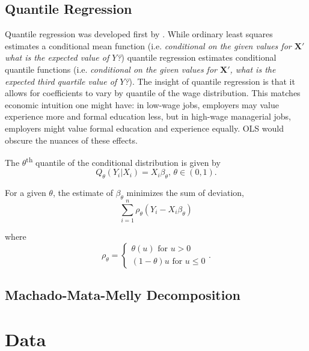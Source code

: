 \documentclass[12pt]{article}
\begin{document}
\subsection{Quantile Regression
\label{subsec:quantile-regression}}
Quantile regression was developed first by \citet{KoenkerandBassett1978}. While ordinary least squares estimates a conditional mean function (i.e.\textit{ conditional on the given values for $\mathbf{X'}$ what is the expected value of $Y$?}) quantile regression estimates conditional quantile functions (i.e.\textit{ conditional on the given values for $\mathbf{X'}$, what is the expected third quartile value of $Y$?}). The insight of quantile regression is that it allows for coefficients to vary by quantile of the wage distribution. This matches economic intuition one might have: in low-wage jobs, employers may value experience more and formal education less, but in high-wage managerial jobs, employers might value formal education and experience equally. OLS would obscure the nuances of these effects.

The $\theta$\textsuperscript{th} quantile of the conditional distribution is given by
\begin{equation}
	Q_{\theta}\left(Y_i|X_i \right) = X_{i}\beta_{\theta}, \, \theta \in (0, 1)
.\end{equation}

For a given $\theta$, the estimate of $\beta_{\theta}$ minimizes the sum of deviation,
\begin{equation}
	\sum_{i=1}^{n} \rho_{\theta} \left( Y_{i} - X_{i} \beta_{\theta} \right) 
\end{equation}

where
\begin{equation}
	\rho_{\theta} = \begin{cases}
		\theta\left(u \right)  \text{ for } u > 0 \\
		\left( 1-\theta \right) u \text{ for } u \leq 0
	\end{cases}
.\end{equation}


\subsection{Machado-Mata-Melly Decomposition
\label{subsec:m-m-m-decomposition}}
\section{Data
\label{sec:data}}
\end{document}
